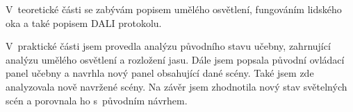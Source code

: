 \medskip
V~teoretické části se zabývám popisem umělého osvětlení, fungováním lidského oka a také popisem DALI protokolu.

\medskip
V~praktické části jsem provedla analýzu původního stavu učebny, zahrnující analýzu umělého osvětlení a
rozložení jasu. Dále jsem popsala původní ovládací panel učebny a navrhla nový panel obsahující dané scény.
Také jsem zde analyzovala nově navržené scény. Na závěr jsem zhodnotila nový stav světelných scén a porovnala ho s~původním návrhem.





